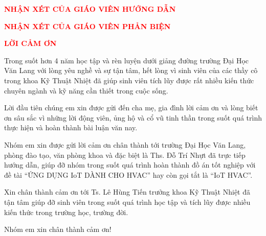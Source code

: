 \newpage
{}
\begin{center}
	\textbf{{\large \textcolor{red}{NHẬN XÉT CỦA GIÁO VIÊN HƯỚNG DẪN}}}
\end{center}

\newpage
{}
\begin{center}
	\textbf{{\large \textcolor{red}{NHẬN XÉT CỦA GIÁO VIÊN PHẢN BIỆN}}}
\end{center}

\newpage
{}
\begin{center}
	\textbf{{\Large \textcolor{red}{LỜI CẢM ƠN}}}
\end{center}

	Trong suốt hơn 4 năm học tập và rèn luyện dưới giảng đường trường Đại Học Văn Lang với lòng yêu nghề và sự tận tâm, hết lòng vì sinh viên của các thầy cô trong khoa Kỹ Thuật Nhiệt đã giúp sinh viên tích lũy được rất nhiều kiến thức chuyên ngành và kỹ năng cần thiết trong cuộc sống.
	
	Lời đầu tiên chúng em xin được gửi đến cha mẹ, gia đình lời cảm ơn và lòng biết ơn sâu sắc vì những lời động viên, ủng hộ và cổ vũ tinh thần trong suốt quá trình thực hiện và hoàn thành bài luận văn nay.
	
	Nhóm em xin được gửi lời cảm ơn chân thành tới trường Đại Học Văn Lang, phòng đào tạo, văn phòng khoa và đặc biệt là Ths. Đỗ Trí Nhựt đã trực tiếp hướng dẫn, giúp đỡ nhóm trong suốt quá trình hoàn thành đồ án tốt nghiệp với đề tài ``ỨNG DỤNG IoT DÀNH CHO HVAC'' hay còn gọi tắt là ``IoT HVAC''.
	
	Xin chân thành cảm ơn tới Ts. Lê Hùng Tiến trưởng khoa Kỹ Thuật Nhiệt đã tận tâm giúp đỡ sinh viên trong suốt quá trình học tập và tích lũy được nhiều kiến thức trong trường học, trường đời. 
	
\begin{flushright}
	Nhóm em xin chân thành cảm ơn!		
\end{flushright}